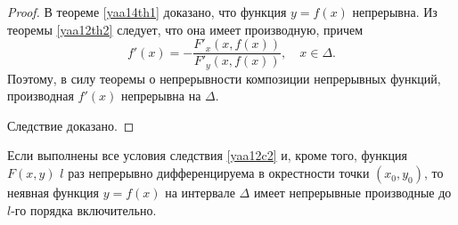 \begin{proof}
В теореме \ref{yaa14th1} доказано, что функция $y=f(x)$ непрерывна. Из теоремы \ref{yaa12th2} следует, что она имеет производную, причем
$$
f'(x)=-\frac{F'_x(x,f(x))}{F'_y(x,f(x))},\quad x\in\Delta.
$$
Поэтому, в силу теоремы о непрерывности композиции непрерывных функций, производная $f'(x)$ непрерывна на $\Delta$.

Следствие доказано.
\end{proof}

\begin{cons}
Если выполнены все условия следствия \ref{yaa12c2} и, кроме того, функция $F(x,y)$ $l$ раз непрерывно дифференцируема в окрестности точки $(x_0,y_0)$, то неявная функция $y=f(x)$ на интервале $\Delta$ имеет непрерывные производные до $l$-го порядка включительно.
\end{cons}